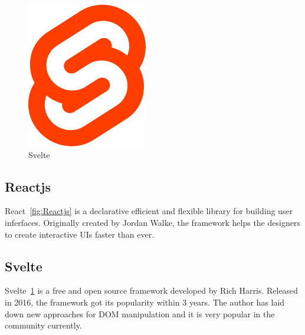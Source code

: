 \documentclass{article}
\begin{document}
\begin{figure}[H]
\begin{minipage}[c]{0.4\textwidth}
    \includegraphics[width=\textwidth,scale=0.5]{svelte.png}
    \caption{Svelte}
    \label{fig:Svelte}
  \end{minipage}
\end{figure}

\subsection{Reactjs}
 React~\ref{fig:Reactjs} is a declarative efficient and flexible library for building user inferfaces. Originally created by Jordan Walke, the framework helps the designers to create interactive UIs faster than ever.
 \subsection{Svelte}
 Svelte~\ref{fig:Svelte} is a free and open source framework developed by Rich Harris. Released in 2016, the framework got its popularity within 3 years. The author has laid down new approaches for DOM manipulation and it is very popular in the community currently.
\end{document}
